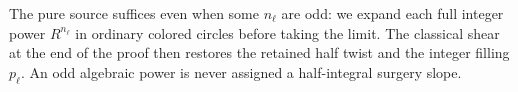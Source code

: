 The pure source suffices even when some $n_\ell$ are odd: we expand
each full integer power $R^{n_\ell}$ in ordinary colored circles
before taking the limit. The classical shear at the end of the proof
then restores the retained half twist and the integer filling
$p_\ell$. An odd algebraic power is never assigned a half-integral
surgery slope.
